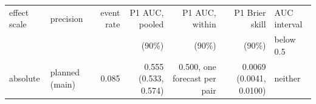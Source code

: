 \begin{tabular}{llrrrrl}
\toprule
effect scale & precision & event rate & P1 AUC, pooled & P1 AUC, within & P1 Brier skill & AUC interval \\
 & & & (90\%) & (90\%) & (90\%) & below 0.5 \\
\midrule
absolute & planned (main) & 0.085 & 0.555 (0.533, 0.574) & 0.500, one forecast per pair & 0.0069 (0.0041, 0.0100) & neither \\

\end{tabular}
